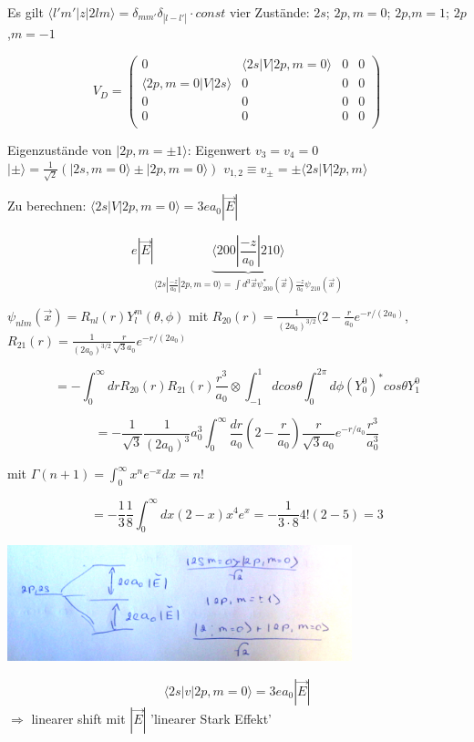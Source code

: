 Es gilt \(\langle l'm'|z|2 l m\rangle = \delta_{mm'}\delta_{|l-l'|}\cdot const\) vier Zustände: \(2s\); \(2p,m=0\); \(2p\),\(m=1\); \(2p\),\(m=-1\)

\[ V_D = 
\begin{pmatrix} 0 & \langle 2s|V| 2p,m=0\rangle&0&0 \\
  \langle 2p,m=0|V| 2s\rangle&0&0&0\\
  0&0&0&0\\
  0&0&0&0\\
\end{pmatrix}
\]

Eigenzustände von \(|2p,m=\pm 1\rangle\): Eigenwert \(v_3=v_4=0\) \(|\pm\rangle=\frac{1}{\sqrt 2}(|2s,m=0\rangle \pm |2p,m=0\rangle)\) \(v_{1,2}\equiv v_{\pm}=\pm \langle 2s|V|2p,m\rangle\)

Zu berechnen: \(\langle 2s|V|2p,m=0\rangle= 3ea_0|\vec E|\)

\[e|\vec E| \underbrace{\langle 200|\frac{-z}{a_0}|210\rangle}_{\langle 2s|\frac{-z}{a_0}|2p,m=0\rangle=\int d^3\vec x \psi^*_{200}(\vec x)\frac{-z}{a_0}\psi_{210} (\vec x) }\]

\(\psi_{nlm}(\vec x) = R_{nl}(r) Y^m_l(\theta,\phi)\) mit \(R_{20}(r) = \frac{1}{(2a_0)^{3/2}}(2-\frac{r}{a_0}e^{-r/(2a_0)}\), \(R_{21}(r) = \frac{1}{(2a_0)^{3/2}}\frac{r}{\sqrt 3 a_0}e^{-r/(2a_0)}\)

\[ = -\int^\infty_0 dr R_{20}(r) R_{21}(r) \frac{r^3}{a_0}\otimes \int^1_{-1}dcos\theta\int^{2\pi}_0 d\phi (Y^0_0)^* cos\theta Y^0_1\]

\[ = -\frac{1}{\sqrt 3} \frac{1}{(2 a_0)^3} a^3_0 \int^\infty_0 \frac{dr}{a_0}(2-\frac{r}{a_0})\frac{r}{\sqrt 3 a_0}e^{-r/a_0}\frac{r^3}{a^3_0}\]

mit \(\Gamma (n+1) = \int^\infty_0 x^ne^{-x}dx=n!\)

\[ = -\frac{1}{3}\frac{1}{8}\int^\infty_0 dx (2-x)x^4e^x = -\frac{1}{3\cdot 8} 4!(2-5)=3\]


\includegraphics[width=0.75\textwidth]{kap03_01.png}


\[ \langle 2s | v | 2p,m=0\rangle = 3ea_0|\vec E|\]
\(\Rightarrow\) linearer shift mit \(|\vec E|\) 'linearer Stark Effekt'


